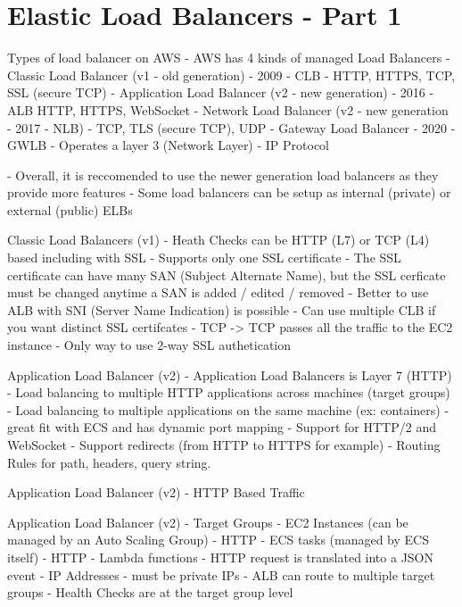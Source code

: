 \documentclass[11pt]{book}
\begin{document}
    \section{Elastic Load Balancers - Part 1}
    Types of load balancer on AWS
    - AWS has 4 kinds of managed Load Balancers
    - Classic Load Balancer (v1 - old generation) - 2009 - CLB
    - HTTP, HTTPS, TCP, SSL (secure TCP)
    - Application Load Balancer (v2 - new generation) - 2016 - ALB
    HTTP, HTTPS, WebSocket
    - Network Load Balancer (v2 - new generation - 2017 - NLB)
    - TCP, TLS (secure TCP), UDP
    - Gateway Load Balancer - 2020 - GWLB
    - Operates a layer 3 (Network Layer) - IP Protocol

    - Overall, it is reccomended to use the newer generation load balancers as they provide more features
    - Some load balancers can be setup as internal (private) or external (public) ELBs

    Classic Load Balancers (v1)
    - Heath Checks can be HTTP (L7) or TCP (L4) based including with SSL
    - Supports only one SSL certificate
    - The SSL certificate can have many SAN (Subject Alternate Name), but the SSL cerficate must be changed anytime a SAN is added / edited / removed
    - Better to use ALB with SNI (Server Name Indication) is possible
    - Can use multiple CLB if you want distinct SSL certifcates
    - TCP -> TCP passes all the traffic to the EC2 instance
    - Only way to use 2-way SSL authetication

    Application Load Balancer (v2)
    - Application Load Balancers is Layer 7 (HTTP)
    - Load balancing to multiple HTTP applications across machines (target groups)
    - Load balancing to multiple applications on the same machine (ex: containers) - great fit with ECS and has dynamic port mapping
    - Support for HTTP/2 and WebSocket
    - Support redirects (from HTTP to HTTPS for example)
    - Routing Rules for path, headers, query string.

    Application Load Balancer (v2) - HTTP Based Traffic

    Application Load Balancer (v2) - Target Groups
    - EC2 Instances (can be managed by an Auto Scaling Group) - HTTP
    - ECS tasks (managed by ECS itself) - HTTP
    - Lambda functions - HTTP request is translated into a JSON event
    - IP Addresses - must be private IPs
    - ALB can route to multiple target groups
    - Health Checks are at the target group level
\end{document}
